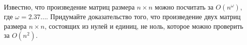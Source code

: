 Известно, что произведение матриц размера $n \times n$ можно посчитать за $O(n^{\omega})$, где $\omega = 2.37...$. Придумайте
доказательство того, что произведение двух матриц размера $n \times n$, состоящих из нулей и единиц, не ноль, которое можно
проверить за $O(n^2)$.